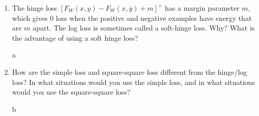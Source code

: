 \documentclass{article}
\begin{document}
\begin{enumerate}
\begin{tcolorbox}
		  \end{tcolorbox}
		\item The hinge loss $[F_W(x, y)- F_W (x, \bar{y}) + m]^{+}$ has a margin parameter $m$, which gives 0 loss when the positive and negative examples have energy that are $m$ apart. The log loss is sometimes called a soft-hinge loss. Why? What is the advantage of using a soft hinge loss?
		  \begin{tcolorbox}
			a
		  \end{tcolorbox}
		\item How are the simple loss and square-square loss different from the hinge/log loss? In what situations would you use the simple loss, and in what situations would you use the square-square loss?
		  \begin{tcolorbox}
			b
		  \end{tcolorbox}
\end{enumerate}
\end{document}
